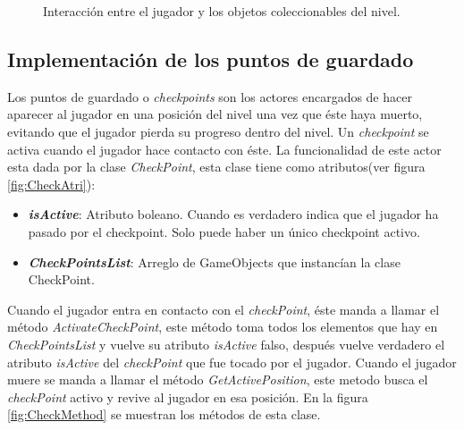			\begin{figure}[h]
	  		\centering
	   
			
	  		\caption{Interacción entre el jugador y los objetos coleccionables del nivel.}
	  		\label{fig:CollectableObjects}
		\end{figure}

\subsection{Implementación de los puntos de guardado}
Los puntos de guardado o \textit{checkpoints} son los actores encargados de 
hacer aparecer al jugador en una posición del nivel una vez que éste haya muerto, 
evitando que el jugador pierda su progreso dentro del nivel. Un 
\textit{checkpoint} se activa cuando el jugador hace contacto con éste. La 
funcionalidad de este actor esta dada por la clase \textit{CheckPoint}, esta clase 
tiene como atributos(ver figura \ref{fig:CheckAtri}):

\begin{itemize}
	\item \textit{\textbf{isActive}}: Atributo boleano. Cuando es verdadero indica 
	que el jugador  ha pasado por el checkpoint. Solo puede haber un único checkpoint 
	activo.
	\item \textit{\textbf{CheckPointsList}}: Arreglo de GameObjects que instancían 
	la clase CheckPoint.
\end{itemize}

Cuando el jugador entra en contacto con el \textit{checkPoint}, éste manda a 
llamar el método \textit{ActivateCheckPoint}, este método toma todos los 
elementos que hay en  \textit{CheckPointsList} y vuelve su atributo 
\textit{isActive} falso, después vuelve verdadero el atributo \textit{isActive} 
del \textit{checkPoint} que fue tocado por el jugador. Cuando el jugador muere 
se manda a llamar el  método \textit{GetActivePosition}, este metodo busca el 
\textit{checkPoint} activo y revive al jugador en esa posición. En la figura 
\ref{fig:CheckMethod} se muestran los métodos de esta clase. 

